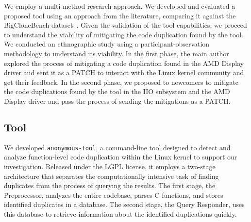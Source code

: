\documentclass[10pt,conference]{IEEEtran}
\begin{document}
We employ a multi-method research approach. We developed and evaluated a proposed tool using an approach from the literature, comparing it against the BigCloneBench dataset~\cite{bigclonebench}.
%
Given the validation of the tool capabilities, we proceed to understand the viability 
of mitigating the code duplication found by the tool. We conducted an ethnographic study 
using a participant-observation methodology to understand its viability.
%
In the first phase, the main author explored the process of mitigating a code duplication found in the AMD Display driver and sent it as a PATCH to interact with the Linux kernel community and get their feedback. In the second phase, we proposed to newcomers to mitigate the code duplications found by the tool in the IIO subsystem and the AMD Display driver and pass the process of sending the mitigations as a PATCH.




\subsection{Tool}
We developed \texttt{anonymous-tool}, a command-line tool designed to detect and analyze function-level code duplication within the Linux kernel to support our investigation. Released under the LGPL license, it employs a two-stage architecture that separates the computationally intensive task of finding duplicates from the process of querying the results. The first stage, the Preprocessor, analyzes the entire codebase, parses C functions, and stores identified duplicates in a database. The second stage, the Query Responder, uses this database to retrieve information about the identified duplications quickly.
\end{document}
